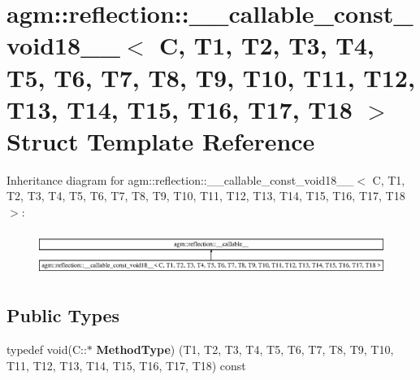 \hypertarget{structagm_1_1reflection_1_1____callable__const__void18____}{}\section{agm\+:\+:reflection\+:\+:\+\_\+\+\_\+callable\+\_\+const\+\_\+void18\+\_\+\+\_\+$<$ C, T1, T2, T3, T4, T5, T6, T7, T8, T9, T10, T11, T12, T13, T14, T15, T16, T17, T18 $>$ Struct Template Reference}
\label{structagm_1_1reflection_1_1____callable__const__void18____}
Inheritance diagram for agm\+:\+:reflection\+:\+:\+\_\+\+\_\+callable\+\_\+const\+\_\+void18\+\_\+\+\_\+$<$ C, T1, T2, T3, T4, T5, T6, T7, T8, T9, T10, T11, T12, T13, T14, T15, T16, T17, T18 $>$\+:\begin{figure}[H]
\begin{center}
\leavevmode
\includegraphics[height=1.450777cm]{structagm_1_1reflection_1_1____callable__const__void18____}
\end{center}
\end{figure}
\subsection*{Public Types}
\begin{DoxyCompactItemize}
\item 
typedef void(C\+::$\ast$ {\bfseries Method\+Type}) (T1, T2, T3, T4, T5, T6, T7, T8, T9, T10, T11, T12, T13, T14, T15, T16, T17, T18) const \hypertarget{structagm_1_1reflection_1_1____callable__const__void18_____a9983c8c6cbfe83155d780d9323c7b84b}{}\label{structagm_1_1reflection_1_1____callable__const__void18_____a9983c8c6cbfe83155d780d9323c7b84b}

\end{DoxyCompactItemize}
